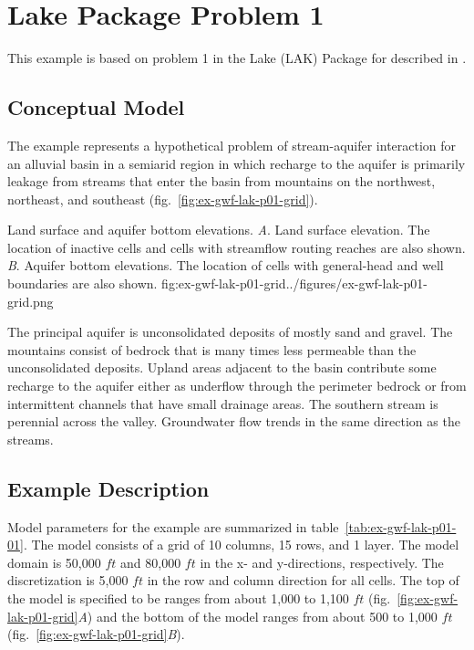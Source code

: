 \section{Lake Package Problem 1}

This example is based on problem 1 in the Lake (LAK) Package for \mftk described in \cite{modflowlak3pack}.                                

\subsection{Conceptual Model}

The example represents a hypothetical problem of stream-aquifer interaction for an alluvial basin in a semiarid region in which recharge to the aquifer is primarily leakage from streams that enter the basin from mountains on the northwest, northeast, and southeast (fig.~\ref{fig:ex-gwf-lak-p01-grid}).

\begin{StandardFigure}{
                                     Land surface and aquifer bottom elevations. 
                                     \textit{A}. Land surface elevation. The location of inactive cells 
                                     and cells with streamflow routing reaches are also shown.
                                     \textit{B}. Aquifer bottom elevations. The location of cells with 
                                     general-head and well boundaries are also shown.
                                     }{fig:ex-gwf-lak-p01-grid}{../figures/ex-gwf-lak-p01-grid.png}
\end{StandardFigure}   

The principal aquifer is unconsolidated deposits of mostly sand and gravel. The mountains consist of bedrock that is many times less permeable than the unconsolidated deposits. Upland areas adjacent to the basin contribute some recharge to the aquifer either as underflow through the perimeter bedrock or from intermittent channels that have small drainage areas. The southern stream is perennial across the valley. Groundwater flow trends in the same direction as the streams.


\subsection{Example Description}
Model parameters for the example are summarized in table~\ref{tab:ex-gwf-lak-p01-01}.  The model consists of a grid of 10 columns, 15 rows, and 1 layer. The model domain is  50,000 $ft$ and 80,000 $ft$ in the x- and y-directions, respectively. The discretization is 5,000 $ft$ in the row and column direction for all cells. The top of the model is specified to be ranges from about 1,000 to 1,100 $ft$ (fig.~\ref{fig:ex-gwf-lak-p01-grid}\textit{A}) and the bottom of the model ranges from about 500 to 1,000 $ft$ (fig.~\ref{fig:ex-gwf-lak-p01-grid}\textit{B}).

